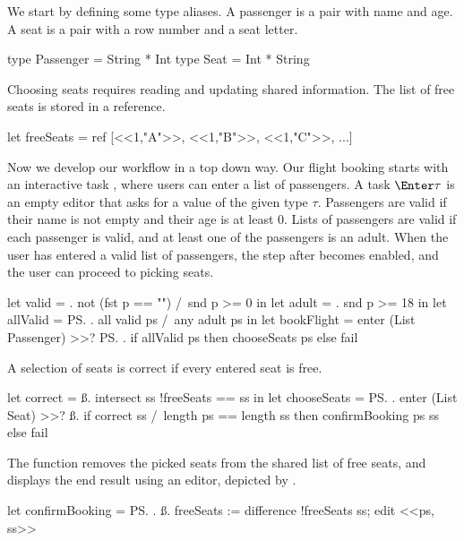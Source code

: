 \begin{example}
\label{exm:flight-booking}

We start by defining some type aliases.
A passenger is a pair with name and age.
A seat is a pair with a row number and a seat letter.
\begin{TASK}
  type Passenger = String * Int
  type Seat = Int * String
\end{TASK}

Choosing seats requires reading and updating shared information.
The list of free seats is stored in a reference. %
\begin{TASK}
  let freeSeats = ref [<<1,"A">>, <<1,"B">>, <<1,"C">>, ...]
\end{TASK}

Now we develop our workflow in a top down way.
Our flight booking starts with an interactive task , where users can enter a list of passengers.
A task $\Enter \tau$ is an empty editor that asks for a value of the given type $\tau$.
Passengers are valid if their name is not empty and their age is at least 0.
Lists of passengers are valid if each passenger is valid, and at least one of the passengers is an adult.
When the user has entered a valid list of passengers, the step after  becomes enabled,
and the user can proceed to picking seats.
\begin{TASK}
  let valid = \p. not (fst p == "") /\ snd p >= 0 in
  let adult = \p. snd p >= 18 in
  let allValid = \ps. all valid ps /\ any adult ps in
  let bookFlight = enter (List Passenger) >>? \ps.
    if allValid ps then chooseSeats ps else fail
\end{TASK}
A selection of seats is correct if every entered seat is free.
\begin{TASK}
  let correct = \ss. intersect ss !freeSeats == ss in
  let chooseSeats = \ps. enter (List Seat) >>? \ss.
    if correct ss /\ length ps == length ss then confirmBooking ps ss else fail
\end{TASK}

The function  removes the picked seats from the shared list of free seats,
and displays the end result using an editor, depicted by .
\begin{TASK}
  let confirmBooking = \ps. \ss.
    freeSeats := difference !freeSeats ss; edit <<ps, ss>>
\end{TASK}


\end{example}
